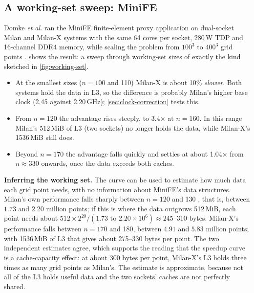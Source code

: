 \subsection{A working-set sweep: MiniFE}
\label{sec:minife}
Domke \emph{et al.} ran the MiniFE finite-element proxy application on dual-socket Milan and Milan-X systems with the same 64 cores per socket, 280\,W TDP and 16-channel DDR4 memory, while scaling the problem from $100^3$ to $400^3$ grid points \cite{domkeLocusPerformanceQuantifying2023}.  shows the result: a sweep through working-set sizes of exactly the kind sketched in \cref{fig:working-set}.
\begin{itemize}
  \item At the smallest sizes ($n = 100$ and 110) Milan-X is about 10\% \emph{slower}. Both systems hold the data in L3, so the difference is probably Milan's higher base clock (2.45 against 2.20\,GHz); \cref{sec:clock-correction} tests this.
  \item From $n = 120$ the advantage rises steeply, to 3.4$\times$ at $n = 160$. In this range Milan's 512\,MiB of L3 (two sockets) no longer holds the data, while Milan-X's 1536\,MiB still does.
  \item Beyond $n = 170$ the advantage falls quickly and settles at about 1.04$\times$ from $n \approx 330$ onwards, once the data exceeds both caches.
\end{itemize}

\textbf{Inferring the working set.} The curve can be used to estimate how much data each grid point needs, with no information about MiniFE's data structures. Milan's own performance falls sharply between $n = 120$ and 130 \cite[Fig.~1]{domkeLocusPerformanceQuantifying2023}, that is, between $1.73$ and $2.20$ million points; if this is where the data outgrows 512\,MiB, each point needs about $512 \times 2^{20} / (1.73\text{ to }2.20 \times 10^6) \approx 245$--310 bytes. Milan-X's performance falls between $n = 170$ and 180, between $4.91$ and $5.83$ million points; with 1536\,MiB of L3 that gives about 275--330 bytes per point. The two independent estimates agree, which supports the reading that the speedup curve is a cache-capacity effect: at about 300 bytes per point, Milan-X's L3 holds three times as many grid points as Milan's. The estimate is approximate, because not all of the L3 holds useful data and the two sockets' caches are not perfectly shared.

